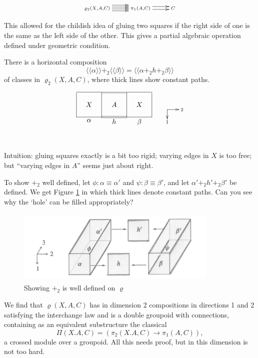 \documentclass{elsarticle}
\makeatletter
\newcommand{\directs}[2]{\def\objectstyle{\scriptstyle}  \objectmargin={0pt}
\xy
(0,4)*+{}="a",(0,-2)*+{\rule{0em}{1.5ex}#2}="b",(7,4)*+{\;#1}="c"
\ar@{->} "a";"b" \ar @{->}"a";"c" \endxy }
\def\rho{\varrho}
\def\xybiglabels{\def\labelstyle{\textstyle}}
\makeatother
\begin{document}
$$ \xymatrix{\rho_2(X,A,C)\ar @<0.33ex> [r]\ar @<-0.33ex>
[r]\ar @<1ex> [r]\ar @<-1ex> [r] & \pi_1(A,C)\ar @<0.5ex> [r] \ar
@<-0.5ex> [r]& C }
$$

 This allowed for the childish idea of gluing   two squares if the right side of one is the same as the left side of the other. This gives a partial   algebraic operation defined under geometric condition.



  There is a horizontal composition $$\langle \!\langle
\alpha \rangle \!\rangle +_2\langle \!\langle \beta \rangle
\!\rangle= \langle\!\langle \alpha +_2 h +_2 \beta \rangle\!\rangle$$ of classes in $\rho_2(X,A,C)$, where thick lines  show
constant paths.

$$\xybiglabels \vcenter{\xymatrix@=3pc@M=0pt{ \ar @{-}[r] \ar@{}[dr]|X \ar @{-}[d]& \ar @{}[dr]|A
\ar @{=}[r] \ar @{-}[d]&\ar @{}[dr]|X \ar @{-}[r]\ar @{-}[d]&\ar @{-}[d] \\
\ar @{-}[r]_\alpha & \ar @{=}[r]_h&\ar @{-}[r]_\beta& \\
&& }}\qquad  \directs{2}{1}
$$

 Intuition: gluing squares exactly is a bit too rigid; varying edges in $X$ is too free; but  ``varying edges in $A$'' seems just about right.

 To show $+_2$ well defined,  let $\phi: \alpha \equiv
\alpha'$ and $\psi: \beta \equiv \beta'$, and let
$\alpha'+_2h'+_2 \beta'$ be defined. We get Figure \ref{fig:hole} in
which thick lines denote constant paths. Can you see why the `hole'
can be filled appropriately?
\begin{figure}[h]
\centering
  \includegraphics[width=3.8in,height=1.4in]{hole2.jpg}
\caption{Showing $+_2$ is well defined on $\rho$ }\label{fig:hole}
\end{figure}

We find that $\rho(X, A, C)$ has in dimension 2 compositions in directions 1 and 2 satisfying
the interchange law and is a double groupoid with connections, containing as an equivalent
substructure the classical
$$\Pi(X.A,C) = (\pi_2(X.A,C) \to \pi_1(A,C)),$$
a crossed module over a groupoid. All this needs proof, but in this dimension is not too hard.
\end{document}
